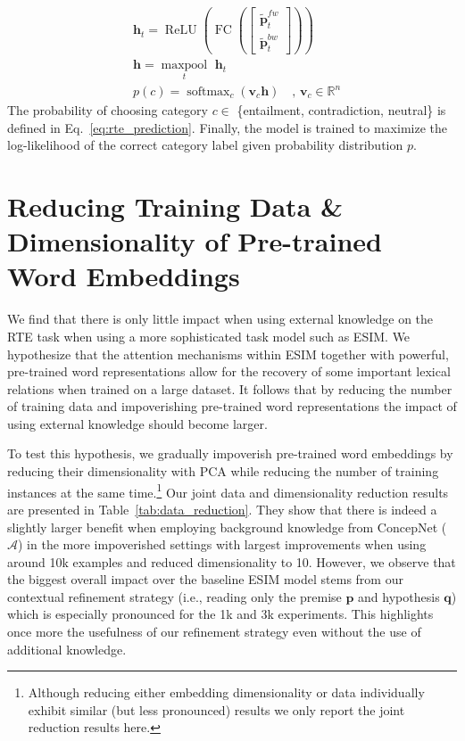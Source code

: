 \documentclass[11pt,a4paper]{article}
\begin{document}
\begin{align}
    &\mathbf{h}_t = \operatorname{ReLU} \left(\operatorname{FC}\left( \begin{bmatrix} \tilde{\mathbf{p}}^{fw}_{t} \\ \tilde{\mathbf{p}}^{bw}_{t}  \end{bmatrix} \right) \right) \nonumber \\
    &\mathbf{h} = \underset{t}{\operatorname{maxpool}}\,\, \mathbf{h}_t \nonumber \\
    & p(c) = \operatorname{softmax}_c(\mathbf{v}_c \mathbf{h}) \quad , \, \mathbf{v}_c \in \mathbb{R}^n \label{eq:rte_prediction}
\end{align}
\noindent The probability of choosing category $c \in$ \{entailment, contradiction, neutral\} is defined in Eq.~\ref{eq:rte_prediction}. Finally, the model is trained to maximize the log-likelihood of the correct category label given probability distribution $p$.


\section{Reducing Training Data \& Dimensionality of Pre-trained Word Embeddings}
\label{sec:reduction_experiments}
We find that there is only little impact when using external knowledge on the RTE task when using a more sophisticated task model such as ESIM. We hypothesize that the attention mechanisms within ESIM together with powerful, pre-trained word representations allow for the recovery of some important lexical relations when trained on a large dataset. It follows that by reducing the number of training data and impoverishing pre-trained word representations the impact of using external knowledge should become larger.

To test this hypothesis, we gradually impoverish pre-trained word embeddings by reducing their dimensionality with PCA while reducing the number of training instances at the same time.\footnote{Although reducing either embedding dimensionality or data individually exhibit similar (but less pronounced) results we only report the joint reduction results here.} Our joint data and dimensionality reduction results are presented in Table~\ref{tab:data_reduction}. They show that there is indeed a slightly larger benefit when employing background knowledge from ConcepNet ($\mathcal{A}$) in the more impoverished settings with largest improvements when using around 10k examples and reduced dimensionality to 10. However, we observe that the biggest overall impact over the baseline ESIM model stems from our contextual refinement strategy (i.e., reading only the premise $\boldsymbol{p}$  and hypothesis $\boldsymbol{q}$) which is especially pronounced for the 1k and 3k experiments. This highlights once more the usefulness of our refinement strategy even without the use of additional knowledge. 
\end{document}
